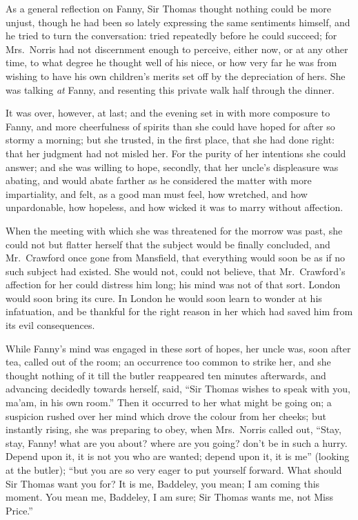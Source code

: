 As a general reflection on Fanny, Sir Thomas thought
nothing could be more unjust, though he had been so lately
expressing the same sentiments himself, and he tried to turn
the conversation:  tried repeatedly before he could succeed;
for Mrs.\ Norris had not discernment enough to perceive,
either now, or at any other time, to what degree he
thought well of his niece, or how very far he was from
wishing to have his own children's merits set off by
the depreciation of hers.  She was talking \emph{at} Fanny,
and resenting this private walk half through the dinner.

It was over, however, at last; and the evening set in with
more composure to Fanny, and more cheerfulness of spirits
than she could have hoped for after so stormy a morning;
but she trusted, in the first place, that she had done right:
that her judgment had not misled her.  For the purity
of her intentions she could answer; and she was willing
to hope, secondly, that her uncle's displeasure was abating,
and would abate farther as he considered the matter with
more impartiality, and felt, as a good man must feel,
how wretched, and how unpardonable, how hopeless,
and how wicked it was to marry without affection.

When the meeting with which she was threatened for the
morrow was past, she could not but flatter herself that
the subject would be finally concluded, and Mr.\ Crawford
once gone from Mansfield, that everything would soon
be as if no such subject had existed.  She would not,
could not believe, that Mr.\ Crawford's affection for her
could distress him long; his mind was not of that sort.
London would soon bring its cure.  In London he would
soon learn to wonder at his infatuation, and be thankful
for the right reason in her which had saved him from its
evil consequences.

While Fanny's mind was engaged in these sort of hopes,
her uncle was, soon after tea, called out of the room;
an occurrence too common to strike her, and she thought nothing
of it till the butler reappeared ten minutes afterwards,
and advancing decidedly towards herself, said, ``Sir Thomas
wishes to speak with you, ma'am, in his own room.''
Then it occurred to her what might be going on; a suspicion
rushed over her mind which drove the colour from her cheeks;
but instantly rising, she was preparing to obey, when Mrs.\ Norris
called out, ``Stay, stay, Fanny! what are you about? where
are you going? don't be in such a hurry.  Depend upon it,
it is not you who are wanted; depend upon it, it is me''
(looking at the butler); ``but you are so very eager to put
yourself forward.  What should Sir Thomas want you for?
It is me, Baddeley, you mean; I am coming this moment.
You mean me, Baddeley, I am sure; Sir Thomas wants me,
not Miss Price.''

